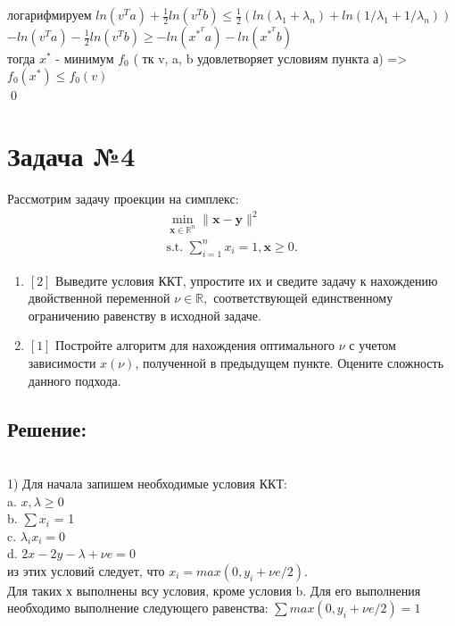 \documentclass[a4paper,12pt]{article}
\begin{document}
логарифмируем $ln(v^Ta) + \frac{1}{2}ln(v^Tb) \leq \frac{1}{2}(ln(\lambda_1 + \lambda_n) + ln(1/\lambda_1 + 1/\lambda_n) ) $ \\

$-ln(v^Ta) - \frac{1}{2}ln(v^Tb) \geq - ln(x^*^Ta) - ln(x^*^Tb)$ \\

тогда $x^*$ - минимум $f_0$ ( тк v, a, b удовлетворяет условиям пункта а) => $f_0(x^*) \leq f_0(v)$ \\ \qed







\newpage
\section*{Задача №4}
Рассмотрим задачу проекции на симплекс:
    \begin{equation*}
        \begin{aligned}
      \min_{\mathbf{x}\in\mathbb{R}^n} \|\mathbf{x}-\mathbf{y}\|^2 \\
        \text{s.t. }\sum\limits_{i=1}^n x_i=1, \mathbf{x}\geq 0.
        \end{aligned}
    \end{equation*}
 \begin{enumerate}
 \item $[2]$ Выведите условия ККТ, упростите их и сведите задачу к нахождению двойственной переменной $\nu\in\mathbb{R},$ соответствующей единственному ограничению равенству в исходной задаче.
 \item $[1]$ Постройте алгоритм для нахождения оптимального $\nu$ с учетом зависимости $x(\nu)$, полученной в предыдущем пункте. Оцените сложность данного подхода.
 \end{enumerate}

\subsection*{Решение:}
\\
1) Для начала запишем необходимые условия ККТ: \\
 a. $x, \lambda \geq 0$ \\
 b.  $\sum x_i$ = 1 \\
 c. $\lambda_ix_i = 0 $ \\
 d. $2x - 2y - \lambda + \nu e = 0 $ 
\\
из этих условий следует, что $x_i = max(0, y_i + \nu e/2)$. \\ Для таких х выполнены всу условия, кроме условия b. Для его выполнения необходимо выполнение следующего равенства: $\sum max(0, y_i + \nu e/2) = 1$\\
\end{document}

